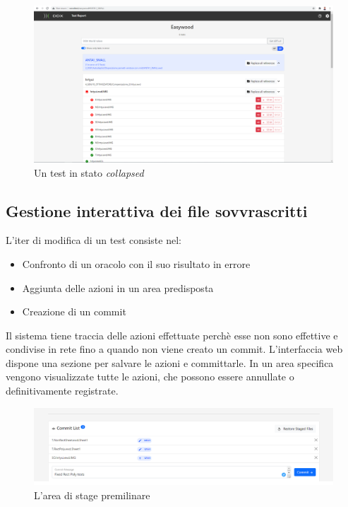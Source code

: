             \begin{figure}[h!]
                \includegraphics[width=\textwidth]{images/collpapsed.png}
                \caption{Un test in stato \textit{collapsed}}
            \end{figure}
            
        \subsection{Gestione interattiva dei file sovvrascritti}
            L'iter di modifica di un test consiste nel: 
            \begin{itemize}
                \item Confronto di un oracolo con il suo risultato in errore
                \item Aggiunta delle azioni in un area predisposta
                \item Creazione di un commit
            \end{itemize}      
            Il sistema tiene traccia delle azioni effettuate perchè esse non sono effettive e condivise in rete fino a quando non viene creato un commit.
            L'interfaccia web dispone una sezione per salvare le azioni e committarle.
            In un area specifica vengono visualizzate tutte le azioni, che possono essere annullate o definitivamente registrate.
            \begin{figure}[h!]
                \includegraphics[width=\textwidth]{images/commit_list.png}
                \caption{L'area di stage premilinare}
            \end{figure}
